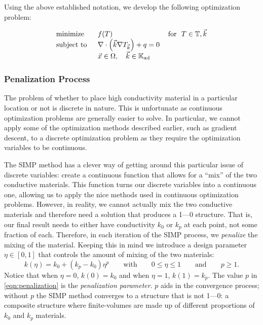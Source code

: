 Using the above established notation, we develop the following optimization problem:

{\color{baystate}
	\begin{equation}
		\begin{tabular}{lll}
			\text{minimize }   & $f(T)$ & \text{for } $T\in\mathbb{T},\vec{k}$      \\
			\text{subject to } & $\nabla\cdot\left(\vec{k}\nabla T_{\vec{k}}\right)+q=0$ & \\
			& $\vec{x}\in\Omega,\quad\vec{k}\in\mathbb{K}_{\text{ad}}$&      
		\end{tabular}\label{SIMP-Optimization-Problem}
	\end{equation}
}

\subsubsection*{Penalization Process}
The problem of whether to place high conductivity material in a particular location or not is discrete in nature. This is unfortunate as continuous optimization problems are generally easier to solve. In particular, we cannot apply some of the optimization methods described earlier, such as gradient descent, to a discrete optimization problem as they require the optimization variables to be continuous.

The SIMP method has a clever way of getting around this particular issue of discrete variables: create a continuous function that allows for a ``mix'' of the two conductive materials. This function turns our discrete variables into a continuous one, allowing us to apply the nice methods used in continuous optimization problems. However, in reality, we cannot actually mix the two conductive materials and therefore need a solution that produces a 1---0 structure. That is, our final result needs to either have conductivity $k_0$ or $k_p$ at each point, not some fraction of each. Therefore, in each iteration of the SIMP process, we \textit{penalize} the mixing of the material. Keeping this in mind we introduce a design parameter $\eta\in\left[0,1\right]$ that controls the amount of mixing of the two materials:
\begin{equation}
	k\left(\eta\right)=k_0+\left(k_p-k_0\right)\eta^p\qquad\text{with}\qquad 0\leq\eta\leq 1\qquad\text{and}\qquad p\geq1.\label{eqn:penalization}
\end{equation}
Notice that when $\eta=0$, $k\left(0\right)=k_0$ and when $\eta=1$, $k\left(1\right)=k_p$. The value $p$ in \eqref{eqn:penalization} is the \textit{penalization parameter}. $p$ aids in the convergence process; without $p$ the SIMP method converges to a structure that is not 1---0: a composite structure where finite-volumes are made up of different proportions of $k_0$ and $k_p$ materials.


